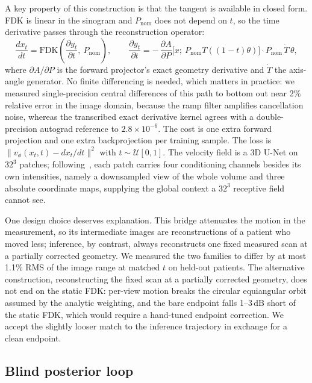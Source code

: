 \documentclass[11pt]{article}
\newcommand{\FDK}{\mathrm{FDK}}
\newcommand{\Pnom}{P_{\mathrm{nom}}}
\begin{document}
A key property of this construction is that the tangent is available in closed form. FDK is
linear in the sinogram and $\Pnom$ does not depend on $t$, so the time derivative passes
through the reconstruction operator:
\begin{equation}
\frac{dx_t}{dt} = \FDK\!\left(\frac{\partial y_t}{\partial t},\ \Pnom\right),
\qquad
\frac{\partial y_t}{\partial t}
= -\,\frac{\partial A}{\partial P}\Big[x;\ \Pnom T((1-t)\theta)\Big]\cdot \Pnom\,\dot{T}\,\theta,
\label{eq:tangent}
\end{equation}
where $\partial A/\partial P$ is the forward projector's exact geometry derivative and
$\dot T$ the axis-angle generator. No finite differencing is needed, which matters in
practice: we measured single-precision central differences of this path to bottom out near
2\% relative error in the image domain, because the ramp filter amplifies cancellation noise,
whereas the transcribed exact derivative kernel agrees with a double-precision autograd
reference to $2.8\times10^{-6}$. The cost is one extra forward projection and one extra
backprojection per training sample. The loss is $\|v_\phi(x_t,t) - dx_t/dt\|^2$ with
$t\sim\mathcal{U}[0,1]$. The velocity field is a 3D U-Net on $32^3$ patches;
following~\cite{yang25}, each patch carries four conditioning channels besides its own
intensities, namely a downsampled view of the whole volume and three absolute coordinate
maps, supplying the global context a $32^3$ receptive field cannot see.

One design choice deserves explanation. This bridge attenuates the motion in the measurement,
so its intermediate images are reconstructions of a patient who moved less; inference, by
contrast, always reconstructs one fixed measured scan at a partially corrected geometry. We
measured the two families to differ by at most 1.1\% RMS of the image range at matched $t$ on
held-out patients. The alternative construction, reconstructing the fixed scan at a partially
corrected geometry, does not end on the static FDK: per-view motion breaks the circular
equiangular orbit assumed by the analytic weighting, and the bare endpoint falls 1--3\,dB
short of the static FDK, which would require a hand-tuned endpoint correction. We accept the
slightly looser match to the inference trajectory in exchange for a clean endpoint.

\subsection{Blind posterior loop}
\label{sec:loop}
\end{document}
